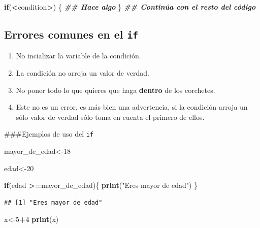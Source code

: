 \documentclass[
]{book}
\newenvironment{Shaded}{\begin{snugshade}}{\end{snugshade}}
\newcommand{\ControlFlowTok}[1]{\textcolor[rgb]{0.13,0.29,0.53}{\textbf{#1}}}
\newcommand{\DecValTok}[1]{\textcolor[rgb]{0.00,0.00,0.81}{#1}}
\newcommand{\DocumentationTok}[1]{\textcolor[rgb]{0.56,0.35,0.01}{\textbf{\textit{#1}}}}
\newcommand{\FunctionTok}[1]{\textcolor[rgb]{0.13,0.29,0.53}{\textbf{#1}}}
\newcommand{\NormalTok}[1]{#1}
\newcommand{\OtherTok}[1]{\textcolor[rgb]{0.56,0.35,0.01}{#1}}
\newcommand{\SpecialCharTok}[1]{\textcolor[rgb]{0.81,0.36,0.00}{\textbf{#1}}}
\newcommand{\StringTok}[1]{\textcolor[rgb]{0.31,0.60,0.02}{#1}}
\providecommand{\tightlist}{%
  \setlength{\itemsep}{0pt}\setlength{\parskip}{0pt}}
\begin{document}
\begin{Shaded}
\begin{Highlighting}[]
\ControlFlowTok{if}\NormalTok{(}\SpecialCharTok{\textless{}}\NormalTok{condition}\SpecialCharTok{\textgreater{}}\NormalTok{) \{}
        \DocumentationTok{\#\# Hace algo}
\NormalTok{\} }
\DocumentationTok{\#\# Continúa con el resto del código}
\end{Highlighting}
\end{Shaded}

\hypertarget{errores-comunes-en-el-if}{%
\subsection{\texorpdfstring{Errores comunes en el \texttt{if}}{Errores comunes en el if}}\label{errores-comunes-en-el-if}}

\begin{enumerate}
\def\labelenumi{\arabic{enumi}.}
\tightlist
\item
  No incializar la variable de la condición.
\item
  La condición no arroja un valor de verdad.
\item
  No poner todo lo que quieres que haga \textbf{dentro} de los corchetes.
\item
  Este no es un error, es más bien una advertencia, si la condición arroja un sólo valor de verdad sólo toma en cuenta el primero de ellos.
\end{enumerate}

\#\#\#Ejemplos de uso del \texttt{if}

\begin{Shaded}
\begin{Highlighting}[]
\NormalTok{mayor\_de\_edad}\OtherTok{\textless{}{-}}\DecValTok{18}

\NormalTok{edad}\OtherTok{\textless{}{-}}\DecValTok{20}

\ControlFlowTok{if}\NormalTok{(edad }\SpecialCharTok{\textgreater{}=}\NormalTok{mayor\_de\_edad)\{}
  \FunctionTok{print}\NormalTok{(}\StringTok{"Eres mayor de edad"}\NormalTok{)}
\NormalTok{\}}
\end{Highlighting}
\end{Shaded}

\begin{verbatim}
## [1] "Eres mayor de edad"
\end{verbatim}

\begin{Shaded}
\begin{Highlighting}[]
\NormalTok{x}\OtherTok{\textless{}{-}}\DecValTok{5}\SpecialCharTok{+}\DecValTok{4}
\FunctionTok{print}\NormalTok{(x)}
\end{Highlighting}
\end{Shaded}
\end{document}
